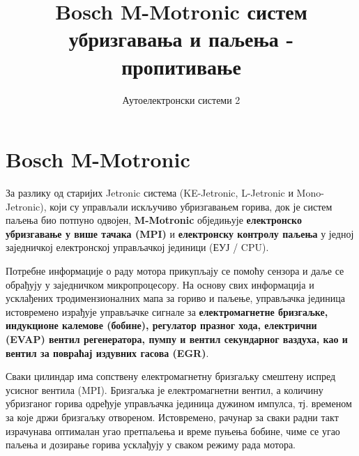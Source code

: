 \documentclass[12pt]{article}
\title{Bosch M-Motronic систем убризгавања и паљења - пропитивање}
\author{Аутоелектронски системи 2}
\date{}
\begin{document}
\maketitle

\section{Bosch M-Motronic}

За разлику од старијих Jetronic система (KE-Jetronic, L-Jetronic и
Mono-Jetronic), који су управљали искључиво убризгавањем горива, док је
систем паљења био потпуно одвојен, \textbf{M-Motronic} обједињује
\textbf{електронско убризгавање у више тачака (MPI)} и \textbf{електронску
контролу паљења} у једној заједничкој електронској управљачкој јединици
(ЕУЈ / CPU).

Потребне информације о раду мотора прикупљају се помоћу сензора и даље се
обрађују у заједничком микропроцесору. На основу свих информација и усклађених
тродимензионалних мапа за гориво и паљење, управљачка јединица истовремено
израђује управљачке сигнале за \textbf{електромагнетне бризгаљке, индукционе
калемове (бобине), регулатор празног хода, електрични (EVAP) вентил
регенератора, пумпу и вентил секундарног ваздуха, као и вентил за повраћај
издувних гасова (EGR)}.

Сваки цилиндар има сопствену електромагнетну бризгаљку смештену испред
усисног вентила (MPI). Бризгаљка је електромагнетни вентил, а количину
убризганог горива одређује управљачка јединица дужином импулса, тј. временом
за које држи бризгаљку отвореном. Истовремено, рачунар за сваки радни такт
израчунава оптималан угао претпаљења и време пуњења бобине, чиме се угао
паљења и дозирање горива усклађују у сваком режиму рада мотора.
\end{document}
